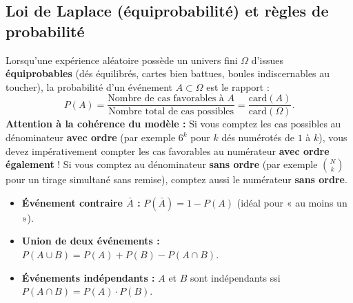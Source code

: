 \subsection{Loi de Laplace (équiprobabilité) et règles de probabilité}

\begin{theoreme}
Lorsqu'une expérience aléatoire possède un univers fini $\Omega$ d'issues \textbf{équiprobables} (dés équilibrés, cartes bien battues, boules indiscernables au toucher), la probabilité d'un événement $A \subset \Omega$ est le rapport :
\[
    \boxed{P(A) = \frac{\text{Nombre de cas favorables à } A}{\text{Nombre total de cas possibles}} = \frac{\text{card}(A)}{\text{card}(\Omega)}}.
\]
\textbf{Attention à la cohérence du modèle :} Si vous comptez les cas possibles au dénominateur \textbf{avec ordre} (par exemple $6^k$ pour $k$ dés numérotés de $1$ à $k$), vous devez impérativement compter les cas favorables au numérateur \textbf{avec ordre également} ! Si vous comptez au dénominateur \textbf{sans ordre} (par exemple $\binom{N}{k}$ pour un tirage simultané sans remise), comptez aussi le numérateur \textbf{sans ordre}.
\begin{itemize}
    \item \textbf{Événement contraire $\bar{A}$ :} $\boxed{P(\bar{A}) = 1 - P(A)}$ (idéal pour « au moins un »).
    \item \textbf{Union de deux événements :} $\boxed{P(A \cup B) = P(A) + P(B) - P(A \cap B)}$.
    \item \textbf{Événements indépendants :} $A$ et $B$ sont indépendants ssi $\boxed{P(A \cap B) = P(A)\cdot P(B)}$.
\end{itemize}
\end{theoreme}

